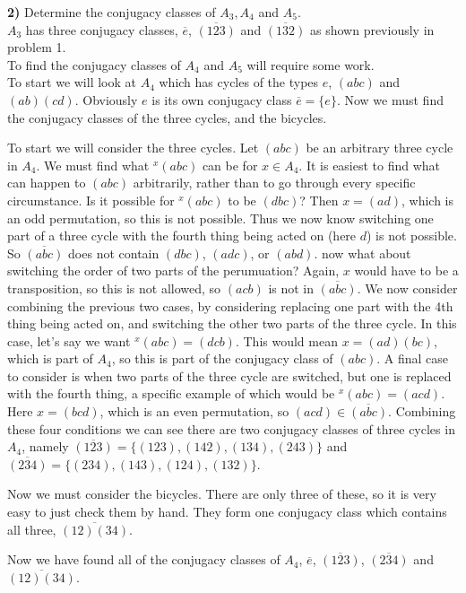 \documentclass{scrartcl}
\begin{document}
\textbf{2)} Determine the conjugacy classes of $A_3, A_4$ and $A_5$.\\

$A_3$ has three conjugacy classes, $\overline{e}$, $\overline{(123)}$ and $\overline{(132)}$ as shown previously in problem 1.\\

To find the conjugacy classes of $A_4$ and $A_5$ will require some work.\\

To start we will look at $A_4$ which has cycles of the types $e$, $(abc)$ and $(ab)(cd)$. Obviously $e$ is its own conjugacy class $\overline{e}=\{e\}$. Now we must find the conjugacy classes of the three cycles, and the bicycles. 

To start we will consider the three cycles. Let $(abc)$ be an arbitrary three cycle in $A_4$. We must find what $^x(abc)$ can be for $x \in A_4$. It is easiest to find what can happen to $(abc)$ arbitrarily, rather than to go through every specific circumstance. Is it possible for $^x(abc)$ to be $(dbc)$? Then $x=(ad)$, which is an odd permutation, so this is not possible. Thus we now know switching one part of a three cycle with the fourth thing being acted on (here $d$) is not possible. So $\overline{(abc)}$ does not contain $(dbc)$, $(adc)$, or $(abd)$. now what about switching the order of two parts of the perumuation? Again, $x$ would have to be a transposition, so this is not allowed, so $(acb)$ is not in $\overline{(abc)}$. We now consider combining the previous two cases, by considering replacing one part with the 4th thing being acted on, and switching the other two parts of the three cycle. In this case, let's say we want $^x(abc)=(dcb)$. This would mean $x=(ad)(bc)$, which is part of $A_4$, so this is part of the conjugacy class of $(abc)$. A final case to consider is when two parts of the three cycle are switched, but one is replaced with the fourth thing, a specific example of which would be $^x(abc)=(acd)$. Here $x=(bcd)$, which is an even permutation, so $(acd) \in \overline{(abc)}$. Combining these four conditions we can see there are two conjugacy classes of three cycles in $A_4$, namely $\overline{(123)}=\{(123),(142),(134),(243)\}$ and $\overline{(234)}=\{(234),(143),(124),(132)\}$.

Now we must consider the bicycles. There are only three of these, so it is very easy to just check them by hand. They form one conjugacy class which contains all three, $\overline{(12)(34)}$.

Now we have found all of the conjugacy classes of $A_4$, $\overline{e}$, $\overline{(123)}$, $\overline{(234)}$ and $\overline{(12)(34)}$.\\
\end{document}
